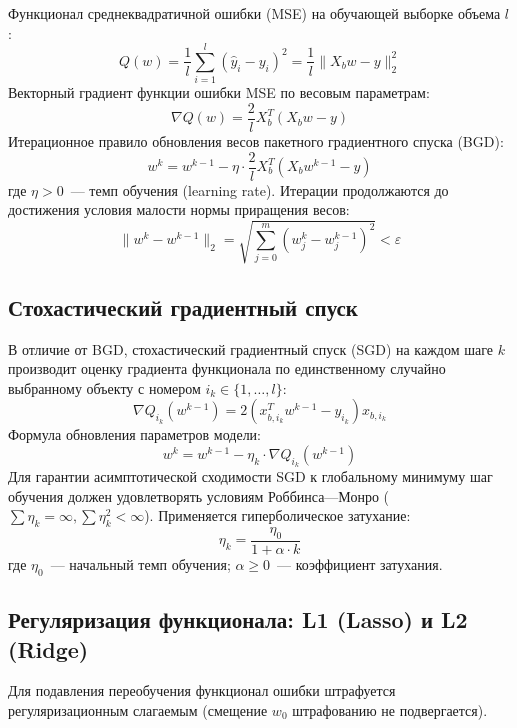 \documentclass[14pt,a4paper]{extarticle}
\begin{document}
Функционал среднеквадратичной ошибки (MSE) на обучающей выборке объема $l$:
\begin{equation}
    Q(w) = \frac{1}{l} \sum_{i=1}^l (\hat{y}_i - y_i)^2 = \frac{1}{l} \|X_b w - y\|_2^2
\end{equation}
Векторный градиент функции ошибки MSE по весовым параметрам:
\begin{equation}
    \nabla Q(w) = \frac{2}{l} X_b^T (X_b w - y)
\end{equation}
Итерационное правило обновления весов пакетного градиентного спуска (BGD):
\begin{equation}
    w^k = w^{k-1} - \eta \cdot \frac{2}{l} X_b^T (X_b w^{k-1} - y)
\end{equation}
где $\eta > 0$~--- темп обучения (learning rate). Итерации продолжаются до достижения условия малости нормы приращения весов:
\begin{equation}
    \|w^k - w^{k-1}\|_2 = \sqrt{\sum_{j=0}^m (w_j^k - w_j^{k-1})^2} < \varepsilon
\end{equation}

\subsection{Стохастический градиентный спуск}
В отличие от BGD, стохастический градиентный спуск (SGD) на каждом шаге $k$ производит оценку градиента функционала по единственному случайно выбранному объекту с номером $i_k \in \{1, \dots, l\}$:
\begin{equation}
    \nabla Q_{i_k}(w^{k-1}) = 2 (x_{b, i_k}^T w^{k-1} - y_{i_k}) x_{b, i_k}
\end{equation}
Формула обновления параметров модели:
\begin{equation}
    w^k = w^{k-1} - \eta_k \cdot \nabla Q_{i_k}(w^{k-1})
\end{equation}
Для гарантии асимптотической сходимости SGD к глобальному минимуму шаг обучения должен удовлетворять условиям Роббинса---Монро ($\sum \eta_k = \infty, \sum \eta_k^2 < \infty$). Применяется гиперболическое затухание:
\begin{equation}
    \eta_k = \frac{\eta_0}{1 + \alpha \cdot k}
\end{equation}
где $\eta_0$~--- начальный темп обучения; $\alpha \ge 0$~--- коэффициент затухания.

\subsection{Регуляризация функционала: L1 (Lasso) и L2 (Ridge)}
Для подавления переобучения функционал ошибки штрафуется регуляризационным слагаемым (смещение $w_0$ штрафованию не подвергается).
\end{document}
